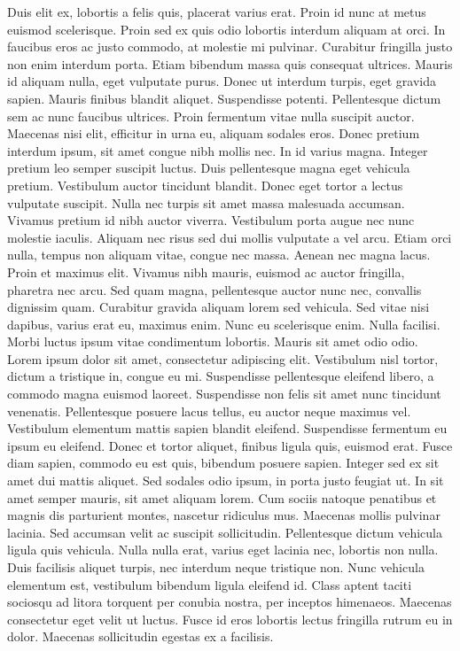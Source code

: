 \documentclass[a4paper,11pt,twoside]{book}
\begin{document}
Duis elit ex, lobortis a felis quis, placerat varius erat. Proin id nunc at metus euismod scelerisque. Proin sed ex quis odio lobortis interdum aliquam at orci. In faucibus eros ac justo commodo, at molestie mi pulvinar. Curabitur fringilla justo non enim interdum porta. Etiam bibendum massa quis consequat ultrices. Mauris id aliquam nulla, eget vulputate purus. Donec ut interdum turpis, eget gravida sapien. Mauris finibus blandit aliquet. Suspendisse potenti. Pellentesque dictum sem ac nunc faucibus ultrices. Proin fermentum vitae nulla suscipit auctor. Maecenas nisi elit, efficitur in urna eu, aliquam sodales eros. Donec pretium interdum ipsum, sit amet congue nibh mollis nec.
In id varius magna. Integer pretium leo semper suscipit luctus. Duis pellentesque magna eget vehicula pretium. Vestibulum auctor tincidunt blandit. Donec eget tortor a lectus vulputate suscipit. Nulla nec turpis sit amet massa malesuada accumsan. Vivamus pretium id nibh auctor viverra. Vestibulum porta augue nec nunc molestie iaculis. Aliquam nec risus sed dui mollis vulputate a vel arcu. Etiam orci nulla, tempus non aliquam vitae, congue nec massa.
Aenean nec magna lacus. Proin et maximus elit. Vivamus nibh mauris, euismod ac auctor fringilla, pharetra nec arcu. Sed quam magna, pellentesque auctor nunc nec, convallis dignissim quam. Curabitur gravida aliquam lorem sed vehicula. Sed vitae nisi dapibus, varius erat eu, maximus enim. Nunc eu scelerisque enim. Nulla facilisi.
Morbi luctus ipsum vitae condimentum lobortis. Mauris sit amet odio odio. Lorem ipsum dolor sit amet, consectetur adipiscing elit. Vestibulum nisl tortor, dictum a tristique in, congue eu mi. Suspendisse pellentesque eleifend libero, a commodo magna euismod laoreet. Suspendisse non felis sit amet nunc tincidunt venenatis. Pellentesque posuere lacus tellus, eu auctor neque maximus vel. Vestibulum elementum mattis sapien blandit eleifend. Suspendisse fermentum eu ipsum eu eleifend. Donec et tortor aliquet, finibus ligula quis, euismod erat.
Fusce diam sapien, commodo eu est quis, bibendum posuere sapien. Integer sed ex sit amet dui mattis aliquet. Sed sodales odio ipsum, in porta justo feugiat ut. In sit amet semper mauris, sit amet aliquam lorem. Cum sociis natoque penatibus et magnis dis parturient montes, nascetur ridiculus mus. Maecenas mollis pulvinar lacinia. Sed accumsan velit ac suscipit sollicitudin. Pellentesque dictum vehicula ligula quis vehicula. Nulla nulla erat, varius eget lacinia nec, lobortis non nulla. Duis facilisis aliquet turpis, nec interdum neque tristique non. Nunc vehicula elementum est, vestibulum bibendum ligula eleifend id. Class aptent taciti sociosqu ad litora torquent per conubia nostra, per inceptos himenaeos. Maecenas consectetur eget velit ut luctus. Fusce id eros lobortis lectus fringilla rutrum eu in dolor. Maecenas sollicitudin egestas ex a facilisis.
\end{document}

